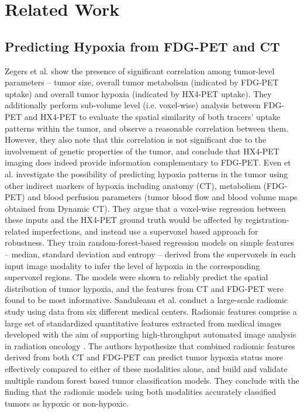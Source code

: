 \chapter{Related Work}
\label{Related_Work}

\section{Predicting Hypoxia from FDG-PET and CT}
\label{Related_Work-hypoxia_prediction}
Zegers et al. \cite{zegers2014vivo} show the presence of significant correlation among tumor-level parameters -- tumor size, overall tumor metabolism (indicated by FDG-PET uptake) and overall tumor hypoxia (indicated by HX4-PET uptake). They additionally perform sub-volume level (i.e. voxel-wise) analysis between FDG-PET and HX4-PET to evaluate the spatial similarity of both tracers' uptake patterns within the tumor, and observe a reasonable correlation between them. However, they also note that this correlation is not significant due to the involvement of genetic properties of the tumor, and conclude that HX4-PET imaging does indeed provide information complementary to FDG-PET. Even et al. \cite{even2017predicting} investigate the possibility of predicting hypoxia patterns in the tumor using other indirect markers of hypoxia including anatomy (CT), metabolism (FDG-PET) and blood perfusion parameters (tumor blood flow and blood volume maps obtained from Dynamic CT). They argue that a voxel-wise regression between these inputs and the HX4-PET ground truth would be affected by registration-related imperfections, and instead use a supervoxel based approach for robustness. They train random-forest-based regression models on simple features -- median, standard deviation and entropy -- derived from the supervoxels in each input image modality to infer the level of hypoxia in the corresponding supervoxel regions. The models were shown to reliably predict the spatial distribution of tumor hypoxia, and the features from CT and FDG-PET were found to be most informative. Sanduleanu et al. \cite{sanduleanu2020non} conduct a large-scale radiomic study using data from six different medical centers. Radiomic features comprise a large set of standardized quantitative features extracted from medical images developed with the aim of supporting high-throughput automated image analysis in radiation oncology \cite{aerts2014decoding}. The authors hypothesize that combined radiomic features derived from both CT and FDG-PET can predict tumor hypoxia status more effectively compared to either of these modalities alone, and build and validate multiple random forest based tumor classification models. They conclude with the finding that the radiomic models using both modalities accurately classified tumors as hypoxic or non-hypoxic.

